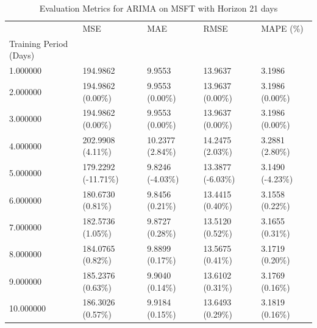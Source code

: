 \begin{table}
\caption{Evaluation Metrics for ARIMA on MSFT with Horizon 21 days}
\label{tab:arima_MSFT_h21_metrics}
\begin{tabular}{lllll}
\toprule
 & MSE & MAE & RMSE & MAPE (\%) \\
Training Period (Days) &  &  &  &  \\
\midrule
1.000000 & 194.9862 & 9.9553 & 13.9637 & 3.1986 \\
2.000000 & 194.9862 (0.00\%) & 9.9553 (0.00\%) & 13.9637 (0.00\%) & 3.1986 (0.00\%) \\
3.000000 & 194.9862 (0.00\%) & 9.9553 (0.00\%) & 13.9637 (0.00\%) & 3.1986 (0.00\%) \\
4.000000 & 202.9908 (4.11\%) & 10.2377 (2.84\%) & 14.2475 (2.03\%) & 3.2881 (2.80\%) \\
5.000000 & 179.2292 (-11.71\%) & 9.8246 (-4.03\%) & 13.3877 (-6.03\%) & 3.1490 (-4.23\%) \\
6.000000 & 180.6730 (0.81\%) & 9.8456 (0.21\%) & 13.4415 (0.40\%) & 3.1558 (0.22\%) \\
7.000000 & 182.5736 (1.05\%) & 9.8727 (0.28\%) & 13.5120 (0.52\%) & 3.1655 (0.31\%) \\
8.000000 & 184.0765 (0.82\%) & 9.8899 (0.17\%) & 13.5675 (0.41\%) & 3.1719 (0.20\%) \\
9.000000 & 185.2376 (0.63\%) & 9.9040 (0.14\%) & 13.6102 (0.31\%) & 3.1769 (0.16\%) \\
10.000000 & 186.3026 (0.57\%) & 9.9184 (0.15\%) & 13.6493 (0.29\%) & 3.1819 (0.16\%) \\
\bottomrule
\end{tabular}
\end{table}
